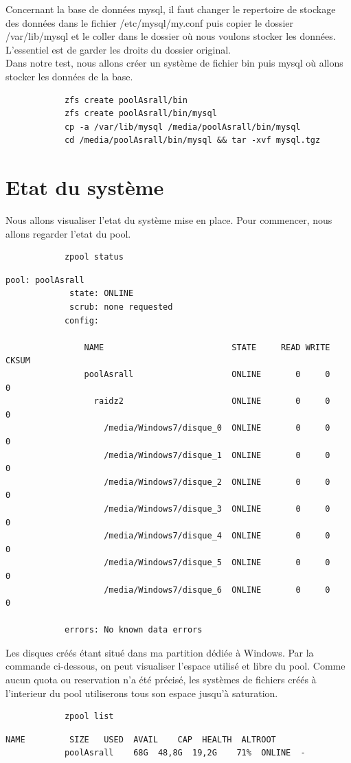 \documentclass[a4paper]{report}
\begin{document}
	Concernant la base de données mysql, il faut changer le repertoire de stockage des données dans le fichier /etc/mysql/my.conf puis copier le dossier /var/lib/mysql et le coller dans le dossier où nous voulons stocker les données. L'essentiel est de garder les droits du dossier original. \\
Dans notre test, nous allons créer un système de fichier bin puis mysql où allons stocker les données de la base.
		\begin{lstlisting}
			zfs create poolAsrall/bin
			zfs create poolAsrall/bin/mysql
			cp -a /var/lib/mysql /media/poolAsrall/bin/mysql
			cd /media/poolAsrall/bin/mysql && tar -xvf mysql.tgz
		\end{lstlisting}
	\section{Etat du système}
	Nous allons visualiser l'etat du système mise en place. Pour commencer, nous allons regarder l'etat du pool.
		\begin{lstlisting}
			zpool status
		\end{lstlisting}
		\begin{lstlisting}[backgroundcolor=\color{yellow}]
			pool: poolAsrall
			 state: ONLINE
			 scrub: none requested
			config:

				NAME                          STATE     READ WRITE CKSUM
				poolAsrall                    ONLINE       0     0     0
				  raidz2                      ONLINE       0     0     0
				    /media/Windows7/disque_0  ONLINE       0     0     0
				    /media/Windows7/disque_1  ONLINE       0     0     0
				    /media/Windows7/disque_2  ONLINE       0     0     0
				    /media/Windows7/disque_3  ONLINE       0     0     0
				    /media/Windows7/disque_4  ONLINE       0     0     0
				    /media/Windows7/disque_5  ONLINE       0     0     0
				    /media/Windows7/disque_6  ONLINE       0     0     0

			errors: No known data errors
		\end{lstlisting}
		Les disques créés étant situé dans ma partition dédiée à Windows. Par la commande ci-dessous, on peut visualiser l'espace utilisé et libre du pool. Comme aucun quota ou reservation n'a été précisé, les systèmes de fichiers créés à l'interieur du pool utiliserons tous son espace jusqu'à saturation.
		\begin{lstlisting}
			zpool list
		\end{lstlisting}
		\begin{lstlisting}[backgroundcolor=\color{yellow}]
			NAME         SIZE   USED  AVAIL    CAP  HEALTH  ALTROOT
			poolAsrall    68G  48,8G  19,2G    71%  ONLINE  -
		\end{lstlisting}
\end{document}
